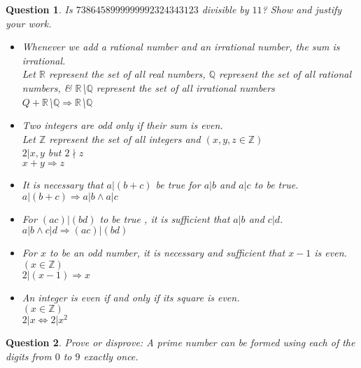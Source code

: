 \documentclass[11pt,oneside]{article}
\newtheorem{question}{Question}
\begin{document}
\begin{question}
    Is $7386458999999992324343123$ divisible by $11$? Show and justify your work.

    \begin{itemize}
      \item Whenever we add a rational number and an irrational number, the sum is irrational. \\
          \emph{Let $\mathbb{R}$ represent the set of all real numbers, $\mathbb{Q}$ represent the set of all rational numbers, \& $\mathbb{R}$\textbackslash $\mathbb{Q}$ represent the set of all irrational numbers} \\
          $Q + \mathbb{R}$\textbackslash $\mathbb{Q} \Rightarrow \mathbb{R}$\textbackslash $\mathbb{Q}$

      \item Two integers are odd only if their sum is even. \\
          \emph{Let $\mathbb{Z}$ represent the set of all integers and $(x,y,z \in \mathbb{Z})$} \\
          \emph{$2|x,y$ but $2 \nmid z$} \\
          $x + y \Rightarrow z$

      \item It is necessary that $a|(b+c)$ be true for $a|b$ and $a|c$ to be true. \\
          $a|(b + c) \Rightarrow a|b \wedge a|c$

      \item For $(ac)|(bd)$ to be true , it is sufficient that $a|b$ and $c|d$. \\
          $a|b \wedge c|d \Rightarrow (ac)|(bd)$

      \item For $x$ to be an odd number, it is necessary and sufficient that $x-1$ is even. \\
          $(x \in \mathbb{Z})$ \\
          $2|(x - 1) \Rightarrow x$

      \item An integer is even if and only if its square is even. \\
          $(x \in \mathbb{Z})$ \\
          $ 2|x \Leftrightarrow 2|x^2$

    \end{itemize}
\end{question}

\begin{question}
	Prove or disprove: A prime number can be formed using each of the digits from $0$ to $9$ exactly once.
\end{question}
\end{document}
